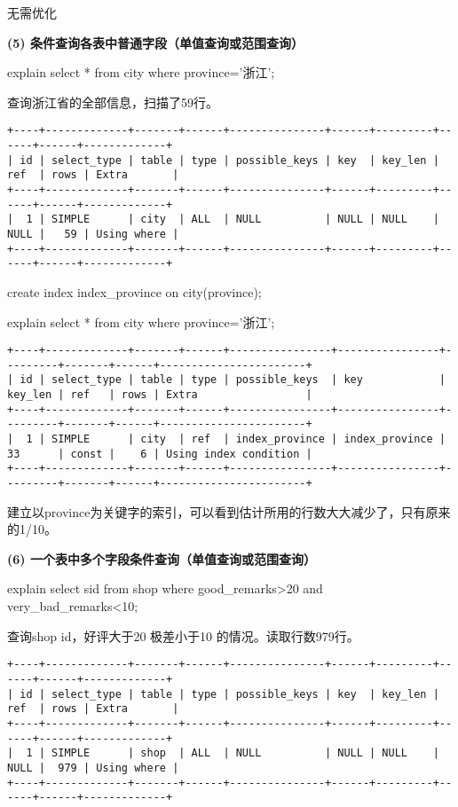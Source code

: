 \documentclass[a4paper, 11pt, nofonts, nocap, fancyhdr]{ctexart}
\begin{document}
无需优化

\vspace{0.7cm}

\textbf{(5) 条件查询各表中普通字段（单值查询或范围查询）} 

explain select * from city where province='浙江';

查询浙江省的全部信息，扫描了59行。

\begin{verbatim}
+----+-------------+-------+------+---------------+------+---------+------+------+-------------+
| id | select_type | table | type | possible_keys | key  | key_len | ref  | rows | Extra       |
+----+-------------+-------+------+---------------+------+---------+------+------+-------------+
|  1 | SIMPLE      | city  | ALL  | NULL          | NULL | NULL    | NULL |   59 | Using where |
+----+-------------+-------+------+---------------+------+---------+------+------+-------------+
\end{verbatim}

create index index\_province on city(province);

explain select * from city where province='浙江';

\begin{verbatim}
+----+-------------+-------+------+----------------+----------------+---------+-------+------+-----------------------+
| id | select_type | table | type | possible_keys  | key            | key_len | ref   | rows | Extra                 |
+----+-------------+-------+------+----------------+----------------+---------+-------+------+-----------------------+
|  1 | SIMPLE      | city  | ref  | index_province | index_province | 33      | const |    6 | Using index condition |
+----+-------------+-------+------+----------------+----------------+---------+-------+------+-----------------------+
\end{verbatim}

建立以province为关键字的索引，可以看到估计所用的行数大大减少了，只有原来的1/10。

\vspace{0.7cm}

\textbf{(6) 一个表中多个字段条件查询（单值查询或范围查询）} 

explain select sid from shop where good\_remarks>20 and very\_bad\_remarks<10;

查询shop id，好评大于20 极差小于10 的情况。读取行数979行。

\begin{verbatim}
+----+-------------+-------+------+---------------+------+---------+------+------+-------------+
| id | select_type | table | type | possible_keys | key  | key_len | ref  | rows | Extra       |
+----+-------------+-------+------+---------------+------+---------+------+------+-------------+
|  1 | SIMPLE      | shop  | ALL  | NULL          | NULL | NULL    | NULL |  979 | Using where |
+----+-------------+-------+------+---------------+------+---------+------+------+-------------+
\end{verbatim}
\end{document}
